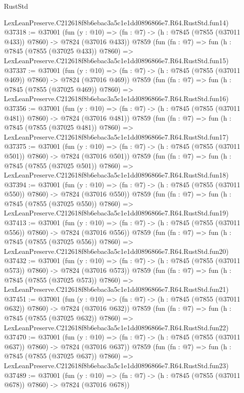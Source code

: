 \begin{lexlean}{RustStd}
\begin{coremodule}
    LexLeanPreserve.C212618f8b6ebac3a5c1e1dd0896866e7.R64.RustStd.fun14)
@37318 := @37001
    (fun (y : @10) => (fn : @7) -> (h : @7845 (@7855 (@37011 @433)) @7860) -> @7824 (@37016 @433))
    @7859
    (fun (fn : @7) =>
    fun (h : @7845 (@7855 (@37025 @433)) @7860) =>
    LexLeanPreserve.C212618f8b6ebac3a5c1e1dd0896866e7.R64.RustStd.fun15)
@37337 := @37001
    (fun (y : @10) => (fn : @7) -> (h : @7845 (@7855 (@37011 @469)) @7860) -> @7824 (@37016 @469))
    @7859
    (fun (fn : @7) =>
    fun (h : @7845 (@7855 (@37025 @469)) @7860) =>
    LexLeanPreserve.C212618f8b6ebac3a5c1e1dd0896866e7.R64.RustStd.fun16)
@37356 := @37001
    (fun (y : @10) => (fn : @7) -> (h : @7845 (@7855 (@37011 @481)) @7860) -> @7824 (@37016 @481))
    @7859
    (fun (fn : @7) =>
    fun (h : @7845 (@7855 (@37025 @481)) @7860) =>
    LexLeanPreserve.C212618f8b6ebac3a5c1e1dd0896866e7.R64.RustStd.fun17)
@37375 := @37001
    (fun (y : @10) => (fn : @7) -> (h : @7845 (@7855 (@37011 @501)) @7860) -> @7824 (@37016 @501))
    @7859
    (fun (fn : @7) =>
    fun (h : @7845 (@7855 (@37025 @501)) @7860) =>
    LexLeanPreserve.C212618f8b6ebac3a5c1e1dd0896866e7.R64.RustStd.fun18)
@37394 := @37001
    (fun (y : @10) => (fn : @7) -> (h : @7845 (@7855 (@37011 @550)) @7860) -> @7824 (@37016 @550))
    @7859
    (fun (fn : @7) =>
    fun (h : @7845 (@7855 (@37025 @550)) @7860) =>
    LexLeanPreserve.C212618f8b6ebac3a5c1e1dd0896866e7.R64.RustStd.fun19)
@37413 := @37001
    (fun (y : @10) => (fn : @7) -> (h : @7845 (@7855 (@37011 @556)) @7860) -> @7824 (@37016 @556))
    @7859
    (fun (fn : @7) =>
    fun (h : @7845 (@7855 (@37025 @556)) @7860) =>
    LexLeanPreserve.C212618f8b6ebac3a5c1e1dd0896866e7.R64.RustStd.fun20)
@37432 := @37001
    (fun (y : @10) => (fn : @7) -> (h : @7845 (@7855 (@37011 @573)) @7860) -> @7824 (@37016 @573))
    @7859
    (fun (fn : @7) =>
    fun (h : @7845 (@7855 (@37025 @573)) @7860) =>
    LexLeanPreserve.C212618f8b6ebac3a5c1e1dd0896866e7.R64.RustStd.fun21)
@37451 := @37001
    (fun (y : @10) => (fn : @7) -> (h : @7845 (@7855 (@37011 @632)) @7860) -> @7824 (@37016 @632))
    @7859
    (fun (fn : @7) =>
    fun (h : @7845 (@7855 (@37025 @632)) @7860) =>
    LexLeanPreserve.C212618f8b6ebac3a5c1e1dd0896866e7.R64.RustStd.fun22)
@37470 := @37001
    (fun (y : @10) => (fn : @7) -> (h : @7845 (@7855 (@37011 @637)) @7860) -> @7824 (@37016 @637))
    @7859
    (fun (fn : @7) =>
    fun (h : @7845 (@7855 (@37025 @637)) @7860) =>
    LexLeanPreserve.C212618f8b6ebac3a5c1e1dd0896866e7.R64.RustStd.fun23)
@37489 := @37001
    (fun (y : @10) => (fn : @7) -> (h : @7845 (@7855 (@37011 @678)) @7860) -> @7824 (@37016 @678))

\end{coremodule}
\end{lexlean}
